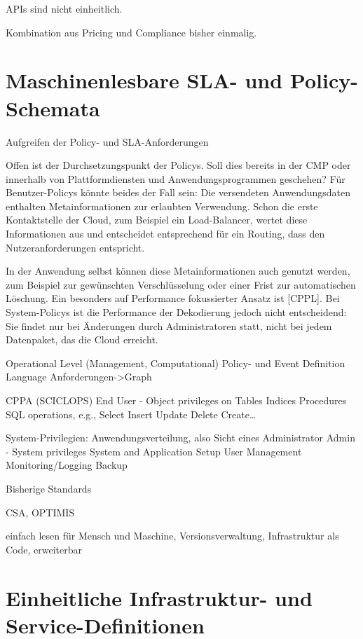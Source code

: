 APIs sind nicht einheitlich.

Kombination aus Pricing und Compliance bisher einmalig.






\section{Maschinenlesbare SLA- und Policy-Schemata}

Aufgreifen der Policy- und SLA-Anforderungen

Offen ist der Durchsetzungspunkt der Policys. Soll dies bereits in der CMP oder innerhalb von Plattformdiensten und Anwendungsprogrammen geschehen? Für Benutzer-Policys könnte beides der Fall sein: Die versendeten Anwendungsdaten enthalten Metainformationen zur erlaubten Verwendung. Schon die erste Kontaktstelle der Cloud, zum Beispiel ein Load-Balancer, wertet diese Informationen aus und entscheidet entsprechend für ein Routing, dass den Nutzeranforderungen entspricht. 

In der Anwendung selbst können diese Metainformationen auch genutzt werden, zum Beispiel zur gewünschten Verschlüsselung oder einer Frist zur automatischen Löschung. Ein besonders auf Performance fokussierter Ansatz ist [CPPL]. Bei System-Policys ist die Performance der Dekodierung jedoch nicht entscheidend: Sie findet nur bei Änderungen durch Administratoren statt, nicht bei jedem Datenpaket, das die Cloud erreicht.

Operational Level (Management, Computational)
Policy- und Event Definition Language
Anforderungen->Graph

CPPA (SCICLOPS) End User - Object privileges on 
Tables 
Indices 
Procedures 
SQL operations, e.g.,  
Select 
Insert 
Update 
Delete 
Create… 

System-Privilegien: Anwendungsverteilung, also Sicht eines Administrator
Admin - System privileges 
System and Application Setup 
User Management
Monitoring/Logging
Backup

Bisherige Standards

CSA, OPTIMIS

einfach lesen für Mensch und Maschine, Versionsverwaltung, Infrastruktur als Code, erweiterbar

\section{Einheitliche Infrastruktur- und Service-Definitionen}


